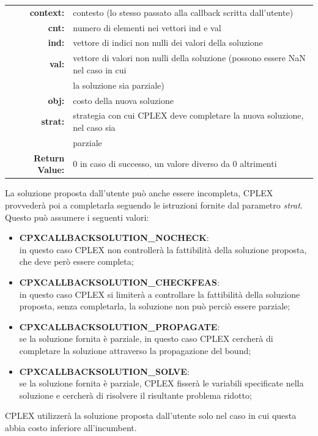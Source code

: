 \begin{table}[h]
\centering
\begin{tabular}{rl}
\textbf{context:} & {contesto (lo stesso passato alla callback scritta dall'utente)}\\
\textbf{cnt:} & {numero di elementi nei vettori ind e val}\\
\textbf{ind:} & {vettore di indici non nulli dei valori della soluzione}\\
\textbf{val:} & {vettore di valori non nulli della soluzione (possono essere NaN nel caso in cui }\\
&{la soluzione sia parziale)}\\
\textbf{obj:} & {costo della nuova soluzione}\\
\textbf{strat:} & {strategia con cui CPLEX deve completare la nuova soluzione, nel caso sia }\\
&{parziale}\\
\textbf{Return Value:} & {0 in caso di successo, un valore diverso da 0 altrimenti}\\
\end{tabular}
\end{table}

La soluzione proposta dall'utente può anche essere incompleta, CPLEX provvederà poi a completarla seguendo le istruzioni fornite dal parametro \textit{strat}. Questo può assumere i seguenti valori:
\begin{itemize}
\item{\textbf{CPXCALLBACKSOLUTION\_NOCHECK}: \\
in questo caso CPLEX non controllerà la fattibilità della soluzione proposta, che deve però essere completa;}
\item{\textbf{CPXCALLBACKSOLUTION\_CHECKFEAS}:\\
in questo caso CPLEX si limiterà a controllare la fattibilità della soluzione proposta, senza completarla, la soluzione non può perciò essere parziale;}
\item{\textbf{CPXCALLBACKSOLUTION\_PROPAGATE}:\\
se la soluzione fornita è parziale, in questo caso CPLEX cercherà di completare la soluzione attraverso la propagazione del bound;}
\item{\textbf{CPXCALLBACKSOLUTION\_SOLVE}:\\
se la soluzione fornita è parziale, CPLEX fisserà le variabili specificate nella soluzione e cercherà di risolvere il risultante problema ridotto;}
\end{itemize}
CPLEX utilizzerà la soluzione proposta dall'utente solo nel caso in cui questa abbia costo inferiore all'incumbent.
